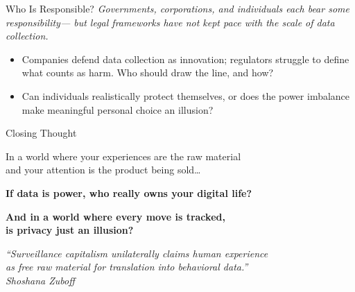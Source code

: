 \documentclass[aspectratio=169]{beamer}
\begin{document}
\begin{frame}{Who Is Responsible?}
    \normalsize
    \textit{Governments, corporations, and individuals each bear some responsibility---
    but legal frameworks have not kept pace with the scale of data collection.}
    \vspace{0.3cm}

    \begin{itemize}
        \setlength\itemsep{0.3cm}
        \item Companies defend data collection as innovation; regulators struggle to define
              what counts as harm. Who should draw the line, and how?
        \item Can individuals realistically protect themselves, or does the power imbalance
              make meaningful personal choice an illusion?
    \end{itemize}
\end{frame}
\begin{frame}{Closing Thought}
    \large
    \vspace{0.5cm}

    \centering
    In a world where your experiences are the raw material\\
    and your attention is the product being sold\ldots
    \vspace{0.6cm}

    \textbf{\textcolor{UGARed}{If data is power, who really owns your digital life?}}
    \vspace{0.4cm}

    \textbf{And in a world where every move is tracked,\\
    is privacy just an illusion?}
    \vspace{0.6cm}

    \normalsize
    \textit{``Surveillance capitalism unilaterally claims human experience\\
    as free raw material for translation into behavioral data.''}\\
    \vspace{0.2cm}
    \textit{Shoshana Zuboff}
\end{frame}
\end{document}
